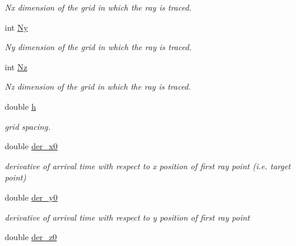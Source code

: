 \begin{DoxyCompactItemize}
\begin{DoxyCompactList}\small\item\em Nx dimension of the grid in which the ray is traced. \end{DoxyCompactList}\item 
\hypertarget{class_ray_a5dcf6898c9aef86a15a3876ecbce1dd4}{}int \hyperlink{class_ray_a5dcf6898c9aef86a15a3876ecbce1dd4}{Ny}\label{class_ray_a5dcf6898c9aef86a15a3876ecbce1dd4}

\begin{DoxyCompactList}\small\item\em Ny dimension of the grid in which the ray is traced. \end{DoxyCompactList}\item 
\hypertarget{class_ray_a2fc9a88559e4bfe1259f4cf937cdec42}{}int \hyperlink{class_ray_a2fc9a88559e4bfe1259f4cf937cdec42}{Nz}\label{class_ray_a2fc9a88559e4bfe1259f4cf937cdec42}

\begin{DoxyCompactList}\small\item\em Nz dimension of the grid in which the ray is traced. \end{DoxyCompactList}\item 
\hypertarget{class_ray_a5fbc95b84d8fd1d7980a737503c36890}{}double \hyperlink{class_ray_a5fbc95b84d8fd1d7980a737503c36890}{h}\label{class_ray_a5fbc95b84d8fd1d7980a737503c36890}

\begin{DoxyCompactList}\small\item\em grid spacing. \end{DoxyCompactList}\item 
\hypertarget{class_ray_ac5789a2463c98202618a3200fe099131}{}double \hyperlink{class_ray_ac5789a2463c98202618a3200fe099131}{der\+\_\+x0}\label{class_ray_ac5789a2463c98202618a3200fe099131}

\begin{DoxyCompactList}\small\item\em derivative of arrival time with respect to x position of first ray point (i.\+e. target point) \end{DoxyCompactList}\item 
\hypertarget{class_ray_ada1b3b30f65ad1870db6032fd8880bee}{}double \hyperlink{class_ray_ada1b3b30f65ad1870db6032fd8880bee}{der\+\_\+y0}\label{class_ray_ada1b3b30f65ad1870db6032fd8880bee}

\begin{DoxyCompactList}\small\item\em derivative of arrival time with respect to y position of first ray point \end{DoxyCompactList}\item 
\hypertarget{class_ray_ac26dc5d46b9ab5b57a542a1c2767861c}{}double \hyperlink{class_ray_ac26dc5d46b9ab5b57a542a1c2767861c}{der\+\_\+z0}\label{class_ray_ac26dc5d46b9ab5b57a542a1c2767861c}


\end{DoxyCompactItemize}
